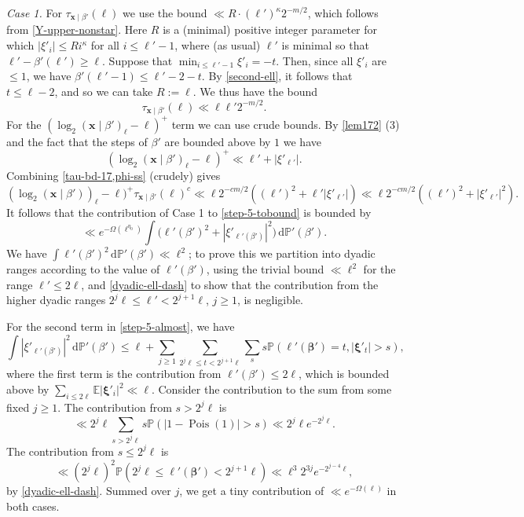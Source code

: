 \documentclass[11pt,reqno]{amsart}
\numberwithin{equation}{section}
\theoremstyle{definition}
\theoremstyle{remark}
\newcommand{\mb}{\mathbb}
\newcommand{\mbf}{\mathbf}
\newcommand\Pois{\operatorname{Pois}}
\def\boldbeta{\boldsymbol\beta}
\def\boldxi{\boldsymbol\xi}
\renewcommand{\le}{\leqslant}
\renewcommand{\ge}{\geqslant}
\begin{document}
\emph{Case 1.}  For $\tau_{\mbf{x} \mid \beta'}(\ell)$ we use the bound $\ll R \cdot (\ell')^{\kappa} 2^{-m/2}$, which follows from \cref{Y-upper-nonstar}. Here $R$ is a (minimal) positive integer parameter for which $|\xi'_i| \le R i^{\kappa}$ for all $i \le \ell' -1$, where (as usual) $\ell'$ is minimal so that $\ell' - \beta'(\ell') \ge \ell$.  Suppose that $\min_{i \le \ell'-1} \xi'_i = -t$. Then, since all $\xi'_i$ are $\le 1$, we have $\beta'(\ell'-1) \le \ell' - 2 - t$. By \cref{second-ell}, it follows that $t \le \ell - 2$, and so we can take $R := \ell$. We thus have the bound
\begin{equation}\label{tau-bd-17} \tau_{\mbf{x} \mid \beta'}(\ell) \ll \ell \ell' 2^{-m/2}. \end{equation}
For the $(\log_2 (\mbf{x} \mid \beta')_{\ell} - \ell)^+$ term we can use crude bounds. By \cref{lem172} (3)  and the fact that the steps of $\beta'$ are bounded above by $1$ we have
\begin{equation}\label{phi-ss} (\log_2 (\mbf{x} \mid \beta')_{\ell} - \ell)^+  \ll \ell' + |\xi'_{\ell'}|  . \end{equation} Combining \cref{tau-bd-17,phi-ss} (crudely) gives
\begin{equation*}
 (\log_2 (\mbf{x} \mid \beta'))_{\ell} - \ell)^+ \tau_{\mbf{x} \mid \beta'}(\ell)^c  \ll \ell 2^{-cm/2} ( (\ell')^2 + \ell'|\xi'_{\ell'}|) \ll \ell 2^{-cm/2} ( (\ell')^2 + |\xi'_{\ell'}|^2).
\end{equation*}
It follows that the contribution of Case 1 to \cref{step-5-tobound} is bounded by 
\begin{equation}\label{step-5-almost} \ll e^{-\Omega(\ell^{\eta_0})} \int \big( \ell'(\beta')^2 + |\xi'_{\ell'(\beta')}|^2 \big)\, \mathrm{d} \mb{P}'(\beta'). \end{equation}
We have $\int \ell'(\beta')^2\, \mathrm{d}\mb{P}'(\beta') \ll \ell^2$; to prove this we partition into dyadic ranges according to the value of $\ell'(\beta')$, using the trivial bound $\ll \ell^2$ for the range $\ell' \le 2\ell$, and \cref{dyadic-ell-dash} to show that the contribution from the higher dyadic ranges $2^j \ell \le \ell' < 2^{j+1} \ell$, $j \ge 1$, is negligible.

For the second term in \cref{step-5-almost}, we have
\[ \int |\xi'_{\ell'(\beta')}|^2\, \mathrm{d}\mb{P}'(\beta') \le  \ell + \sum_{j \ge 1} \sum_{2^j\ell \le t < 2^{j+1} \ell} \sum_s s \mb{P}(\ell'(\boldbeta') = t, |\boldxi'_{t}| > s),\] where the first term is the contribution from $\ell'(\beta') \le 2 \ell$, which is bounded above by $\sum_{i \le 2\ell} \mb{E}|\boldxi'_i|^2  \ll \ell$. Consider the contribution to the sum from some fixed $j \ge 1$. The contribution from $s > 2^j \ell$ is
\[ \ll 2^j \ell \sum_{s > 2^j \ell} s \mb{P}(|1 - \Pois(1)| > s) \ll 2^j \ell e^{-2^j \ell}.\] The contribution from $s \le 2^j \ell$ is
\[ \ll (2^j \ell)^2 \mb{P} (2^j \ell \le \ell'(\boldbeta') < 2^{j+1} \ell) \ll \ell^{3} 2^{3j} e^{-2^{j-4} \ell},\] by \cref{dyadic-ell-dash}. Summed over $j$, we get a tiny contribution of $\ll e^{-\Omega(\ell)}$ in both cases.
\end{document}
